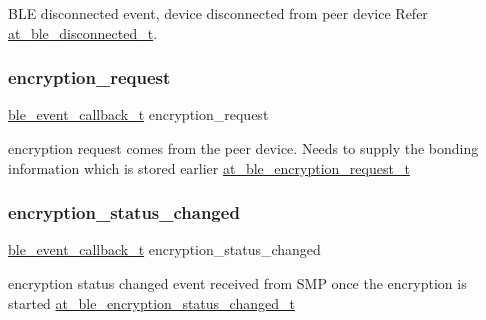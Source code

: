 B\+LE disconnected event, device disconnected from peer device Refer \mbox{\hyperlink{structat__ble__disconnected__t}{at\+\_\+ble\+\_\+disconnected\+\_\+t}}. 

\mbox{\label{structble__gap__event__cb_abb7e482061d1e122de5ef2e8605c14f8}} 
\subsubsection{\texorpdfstring{encryption\_request}{encryption\_request}}
{\footnotesize\ttfamily \mbox{\hyperlink{ble__manager_8h_a04ce4bb8cb8282f2762e3924b1773cc9}{ble\+\_\+event\+\_\+callback\+\_\+t}} encryption\+\_\+request}



encryption request comes from the peer device. Needs to supply the bonding information which is stored earlier \mbox{\hyperlink{structat__ble__encryption__request__t}{at\+\_\+ble\+\_\+encryption\+\_\+request\+\_\+t}} 

\mbox{\label{structble__gap__event__cb_af2a39ef3c65d5a624220c969a9a5beb4}} 
\subsubsection{\texorpdfstring{encryption\_status\_changed}{encryption\_status\_changed}}
{\footnotesize\ttfamily \mbox{\hyperlink{ble__manager_8h_a04ce4bb8cb8282f2762e3924b1773cc9}{ble\+\_\+event\+\_\+callback\+\_\+t}} encryption\+\_\+status\+\_\+changed}



encryption status changed event received from S\+MP once the encryption is started \mbox{\hyperlink{structat__ble__encryption__status__changed__t}{at\+\_\+ble\+\_\+encryption\+\_\+status\+\_\+changed\+\_\+t}} 

\mbox{\label{structble__gap__event__cb_a1c49b2a5f5d3615b3bbc5c2d9150cf0d}} 
